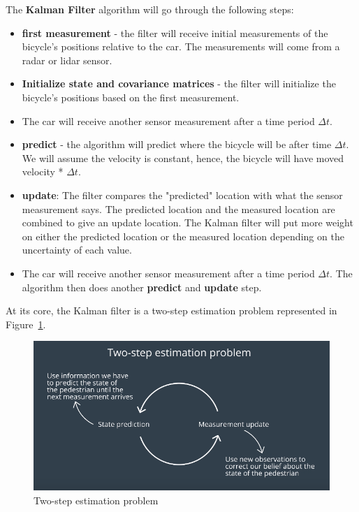 \documentclass[11pt, a4paper]{article}
\begin{document}
The \textbf{Kalman Filter} algorithm will go through the following steps:
\begin{itemize}
	\item \textbf{first measurement} - the filter will receive initial measurements of the bicycle's positions relative to the car. The measurements will come from a radar or lidar sensor. 
	\item \textbf{Initialize state and covariance matrices} - the filter will initialize the bicycle's positions based on the first measurement.
	\item The car will receive another sensor measurement after a time period $\Delta t$.
	\item \textbf{predict} - the algorithm will predict where the bicycle will be after time $\Delta t$. We will assume the velocity is constant, hence, the bicycle will have moved velocity * $\Delta t$.
	\item \textbf{update}: The filter compares the "predicted" location with what the sensor measurement says. The predicted location and the measured location are combined to give an update location. The Kalman filter will put more weight on either the predicted location or the measured location depending on the uncertainty of each value. 
	\item The car will receive another sensor measurement after a time period $\Delta t$. The algorithm then does another \textbf{predict} and \textbf{update} step.
\end{itemize}






At its core, the Kalman filter is a two-step estimation problem represented in Figure~\ref{fig:two-step}.

\begin{figure}[htpb!]
	\centering
	\includegraphics[width=0.8\linewidth]{two-step}
	\caption{Two-step estimation problem}
	\label{fig:two-step}
\end{figure}
\end{document}
